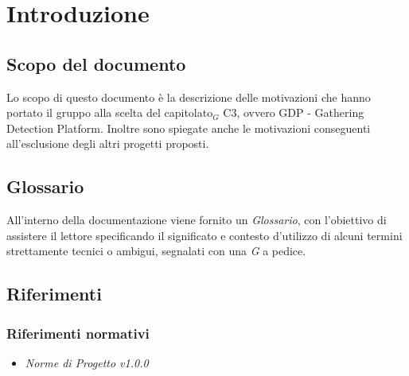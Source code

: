\chapter{Introduzione} \label{Introduzione}

\section{Scopo del documento} \label{ScopoDelDocumento}
Lo scopo di questo documento è la descrizione delle motivazioni che hanno portato il gruppo alla scelta del capitolato$_G$ C3, ovvero GDP - Gathering Detection Platform. Inoltre sono spiegate anche le motivazioni conseguenti all'esclusione degli altri progetti proposti.

\section{Glossario} \label{Glossario}
All'interno della documentazione viene fornito un \textit{Glossario}, con l'obiettivo di assistere il lettore specificando il significato e contesto d'utilizzo di alcuni termini strettamente tecnici o ambigui, segnalati con una \textit{G} a pedice.

\section{Riferimenti} \label{Riferimenti}
\subsection{Riferimenti normativi} \label{RiferimentiNormativi}
\begin{itemize}
	\item \textit{Norme di Progetto v1.0.0}
\end{itemize}
